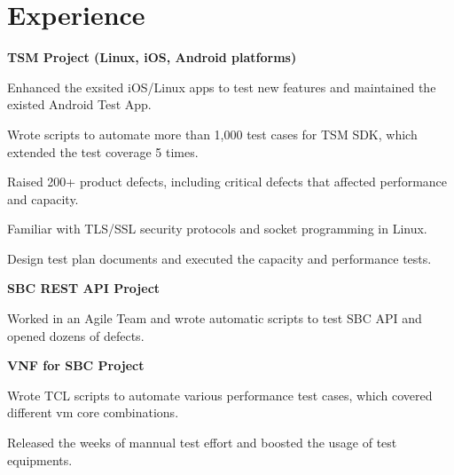 \documentclass[a4paper]{lyu-resume} %
\begin{document}
\hfill
%
%
\begin{minipage}[t]{0.66\textwidth} %
\section{Experience}
\textbf{TSM Project (Linux, iOS, Android platforms)}
\vspace{\topsep} %
\begin{tightitemize}
\item Enhanced the exsited iOS/Linux apps to test new features and maintained the existed Android Test App.
\item Wrote scripts to automate more than 1,000 test cases for TSM SDK, which extended the test coverage 5 times. 
\item Raised 200+ product defects, including critical defects that affected performance and capacity.
\item Familiar with TLS/SSL security protocols and socket programming in Linux.
\item Design test plan documents and executed the capacity and performance tests.
\end{tightitemize}

\vspace{\topsep} %
\textbf{SBC REST API Project}
\begin{tightitemize}
\item Worked in an Agile Team and wrote automatic scripts to test SBC API and opened dozens of defects.
\end{tightitemize}

\vspace{\topsep} %
\textbf{VNF for SBC Project}
\begin{tightitemize}
\item Wrote TCL scripts to automate various performance test cases, which covered different vm core combinations.
\item Released the weeks of mannual test effort and boosted the usage of test equipments.
\end{tightitemize}
\sectionspace %


\end{minipage}
\end{document}
